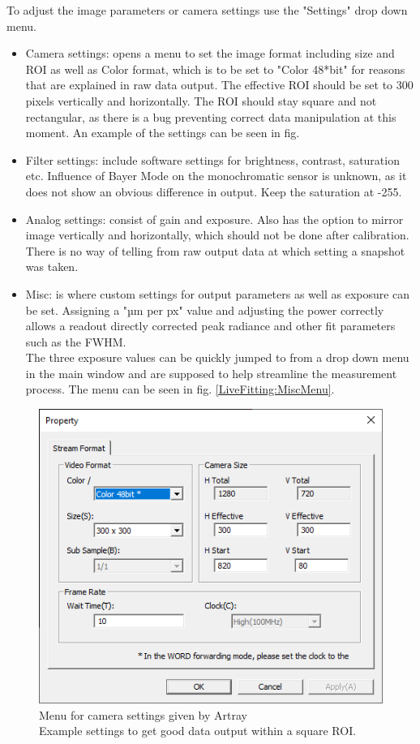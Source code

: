 \documentclass[twoside,openright]{scrreprt}
\begin{document}
To adjust the image parameters or camera settings use the "Settings" drop down menu.
\begin{itemize}
\item Camera settings: opens a menu to set the image format including size and ROI as well as Color format, which is to be set to "Color 48*bit" for reasons that are explained in raw data output. The effective ROI should be set to 300 pixels vertically and horizontally. The ROI should stay square and not rectangular, as there is a bug preventing correct data manipulation at this moment. An example of the settings can be seen in fig. 
\item Filter settings: include software settings for brightness, contrast, saturation etc. Influence of Bayer Mode on the monochromatic sensor is unknown, as it does not show an obvious difference in output. Keep the saturation at -255.
\item Analog settings: consist of gain and exposure. Also has the option to mirror image vertically and horizontally, which should not be done after calibration. There is no way of telling from raw output data at which setting a snapshot was taken.
\item Misc: is where custom settings for output parameters as well as exposure can be set. Assigning a "µm per px" value and adjusting the power correctly allows a readout directly corrected peak radiance and other fit parameters such as the FWHM.\\The three exposure values can be quickly jumped to from a drop down menu in the main window and are supposed to help streamline the measurement process. The menu can be seen in fig. \ref{LiveFitting:MiscMenu}.
\end{itemize}

\begin{figure}[hbtp]
\centering
\includegraphics[width = 0.6\linewidth]{images/ArtrayExamplePics/StreamProperties.PNG}
\caption{Menu for camera settings given by Artray\\ Example settings to get good data output within a square ROI.}
\end{figure}
\end{document}
